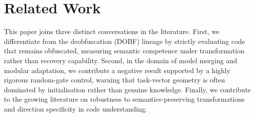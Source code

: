 \section{Related Work}

This paper joins three distinct conversations in the literature. First, we differentiate from the deobfuscation (DOBF) lineage by strictly evaluating code that remains obfuscated, measuring semantic competence under transformation rather than recovery capability. Second, in the domain of model merging and modular adaptation, we contribute a negative result supported by a highly rigorous random-gate control, warning that task-vector geometry is often dominated by initialisation rather than genuine knowledge. Finally, we contribute to the growing literature on robustness to semantics-preserving transformations and direction specificity in code understanding.